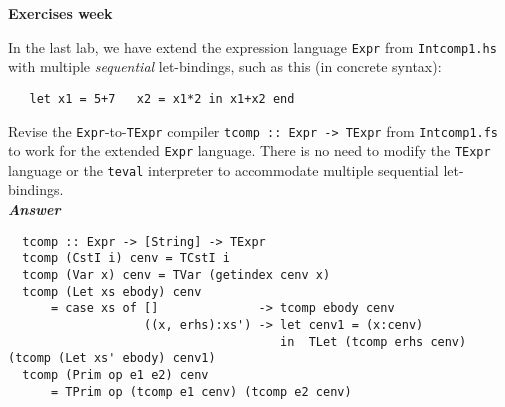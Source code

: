 \documentclass[a4paper]{article}
\begin{document}
\begin{center}
{\Large\bf Exercises week }\\[1ex]
\end{center}










\begin{exercise}\label{exer-multi-let-tcomp}
In the last lab, we have extend the expression language \texttt{Expr} from \texttt{Intcomp1.hs}
  with multiple \emph{sequential} let-bindings, such as this (in
  concrete syntax):

{\codesetup\begin{verbatim}
   let x1 = 5+7   x2 = x1*2 in x1+x2 end
\end{verbatim}}


  Revise the \texttt{Expr}-to-\texttt{TExpr} compiler \texttt{tcomp ::\ 
    Expr -> TExpr} from \texttt{Intcomp1.fs} to work for the extended
  \texttt{Expr} language.
  There is no need to modify the \texttt{TExpr} language or the
  \texttt{teval} interpreter to accommodate multiple sequential
  let-bindings.\\
  
  \noindent
\textbf{\emph{Answer}}
{\codesetup\begin{verbatim}
  tcomp :: Expr -> [String] -> TExpr 
  tcomp (CstI i) cenv = TCstI i
  tcomp (Var x) cenv = TVar (getindex cenv x)
  tcomp (Let xs ebody) cenv
      = case xs of []              -> tcomp ebody cenv 
                   ((x, erhs):xs') -> let cenv1 = (x:cenv)
                                      in  TLet (tcomp erhs cenv) (tcomp (Let xs' ebody) cenv1)
  tcomp (Prim op e1 e2) cenv
      = TPrim op (tcomp e1 cenv) (tcomp e2 cenv)
\end{verbatim}}
\end{exercise}
\end{document}
